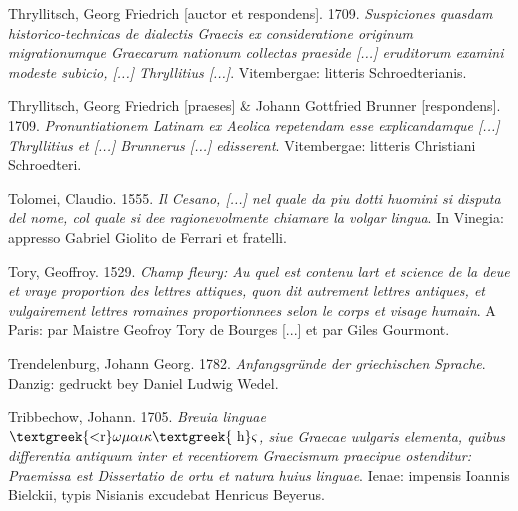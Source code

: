 \begin{styleStandard}
Thryllitsch, Georg Friedrich [auctor et respondens]. 1709. \textit{Suspiciones quasdam historico-technicas de dialectis Graecis ex consideratione originum migrationumque Graecarum nationum collectas praeside [...] eruditorum examini modeste subicio, [...] Thryllitius [...]}. Vitembergae: litteris Schroedterianis.
\end{styleStandard}

\begin{styleStandard}
Thryllitsch, Georg Friedrich [praeses] \& Johann Gottfried Brunner [respondens]. 1709. \textit{Pronuntiationem Latinam ex Aeolica repetendam esse explicandamque [...] Thryllitius et [...] Brunnerus [...] edisserent}. Vitembergae: litteris Christiani Schroedteri.
\end{styleStandard}

\begin{styleStandard}
Tolomei, Claudio. 1555. \textit{Il Cesano, [...] nel quale da piu dotti huomini si disputa del nome, col quale si dee ragionevolmente chiamare la volgar lingua}. In Vinegia: appresso Gabriel Giolito de Ferrari et fratelli.
\end{styleStandard}

\begin{styleStandard}
Tory, Geoffroy. 1529. \textit{Champ fleury: Au quel est contenu lart et science de la deue et vraye proportion des lettres attiques, quon dit autrement lettres antiques, et vulgairement lettres romaines proportionnees selon le corps et visage humain}. A Paris: par Maistre Geofroy Tory de Bourges [...] et par Giles Gourmont.
\end{styleStandard}

\begin{styleStandard}
Trendelenburg, Johann Georg. 1782. \textit{Anfangsgründe der griechischen Sprache}. Danzig: gedruckt bey Daniel Ludwig Wedel.
\end{styleStandard}

\begin{styleStandard}
Tribbechow, Johann. 1705. \textit{Breuia linguae $\text{\textgreek{<r}}\omega \mu \alpha \iota \kappa \text{\textgreek{~h}}\varsigma $, siue Graecae uulgaris elementa, quibus differentia antiquum inter et recentiorem Graecismum praecipue ostenditur: Praemissa est Dissertatio de ortu et natura huius linguae}. Ienae: impensis Ioannis Bielckii, typis Nisianis excudebat Henricus Beyerus.
\end{styleStandard}

